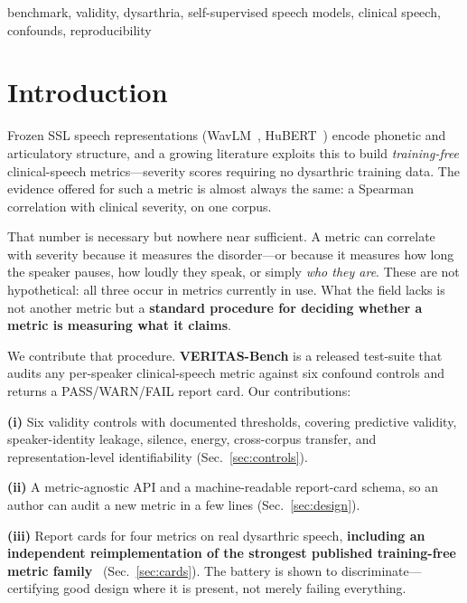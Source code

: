 \documentclass[conference]{IEEEtran}
\begin{document}
\begin{IEEEkeywords}
benchmark, validity, dysarthria, self-supervised speech models, clinical speech,
confounds, reproducibility
\end{IEEEkeywords}

\section{Introduction}
Frozen SSL speech representations (WavLM~\cite{chen2022wavlm},
HuBERT~\cite{hsu2021hubert}) encode phonetic and articulatory structure, and a
growing literature exploits this to build \emph{training-free} clinical-speech
metrics---severity scores requiring no dysarthric training data. The evidence
offered for such a metric is almost always the same: a Spearman correlation with
clinical severity, on one corpus.

That number is necessary but nowhere near sufficient. A metric can correlate with
severity because it measures the disorder---or because it measures how long the
speaker pauses, how loudly they speak, or simply \emph{who they are}. These are
not hypothetical: all three occur in metrics currently in use. What the field
lacks is not another metric but a \textbf{standard procedure for deciding whether
a metric is measuring what it claims}.

We contribute that procedure. \textbf{VERITAS-Bench} is a released test-suite
that audits any per-speaker clinical-speech metric against six confound controls
and returns a PASS/WARN/FAIL report card. Our contributions:

\noindent\textbf{(i)} Six validity controls with documented thresholds, covering
predictive validity, speaker-identity leakage, silence, energy, cross-corpus
transfer, and representation-level identifiability (Sec.~\ref{sec:controls}).

\noindent\textbf{(ii)} A metric-agnostic API and a machine-readable report-card
schema, so an author can audit a new metric in a few lines (Sec.~\ref{sec:design}).

\noindent\textbf{(iii)} Report cards for four metrics on real dysarthric speech,
\textbf{including an independent reimplementation of the strongest published
training-free metric family}~\cite{frozenssl2026a,frozenssl2026b}
(Sec.~\ref{sec:cards}). The battery is shown to discriminate---certifying good
design where it is present, not merely failing everything.
\end{document}
